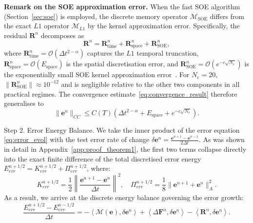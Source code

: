 \documentclass[a4paper,fleqn]{cas-sc}
\begin{document}
\begin{appendix}
\textbf{Remark on the SOE approximation error.} When the fast SOE algorithm (Section~\ref{sec:soe}) is employed, the discrete memory operator $\mathcal{M}_{\mathrm{SOE}}$ differs from the exact $L1$ operator $\mathcal{M}_{L1}$ by the kernel approximation error. Specifically, the residual $\boldsymbol{R}^n$ decomposes as
\begin{equation}
\boldsymbol{R}^n = \boldsymbol{R}_{\mathrm{time}}^n + \boldsymbol{R}_{\mathrm{space}}^n + \boldsymbol{R}_{\mathrm{SOE}}^n,
\end{equation}
where $\boldsymbol{R}_{\mathrm{time}}^n = \mathcal{O}(\Delta t^{2-\alpha})$ captures the $L1$ temporal truncation, $\boldsymbol{R}_{\mathrm{space}}^n = \mathcal{O}(E_{\mathrm{space}})$ is the spatial discretisation error, and $\boldsymbol{R}_{\mathrm{SOE}}^n = \mathcal{O}(e^{-c\sqrt{N_e}})$ is the exponentially small SOE kernel approximation error~\cite{ref6}. For $N_e = 20$, $\|\boldsymbol{R}_{\mathrm{SOE}}^n\| \approx 10^{-12}$ and is negligible relative to the other two components in all practical regimes. The convergence estimate~\eqref{eq:convergence_result} therefore generalises to
\begin{equation}
\|\mathbf{e}^n\|_{CC} \le C(T)\left( \Delta t^{2-\alpha} + E_{\mathrm{space}} + e^{-c\sqrt{N_e}} \right).
\end{equation}

Step 2. Error Energy Balance. 
We take the inner product of the error equation \eqref{eq:error_evol} with the test error rate of change $\delta \mathbf{e}^n = \frac{\mathbf{e}^{n+1} - \mathbf{e}^{n-1}}{2\Delta t}$. As was shown in detail in Appendix~\ref{app:proof_theorem1}, the first two terms collapse directly into the exact finite difference of the total discretised error energy $E_{err}^{n+1/2} = K_{err}^{n+1/2} + \Pi_{err}^{n+1/2}$, where:
\begin{equation}
K_{err}^{n+1/2} = \frac{1}{2} \left\| \frac{\mathbf{e}^{n+1}-\mathbf{e}^n}{\Delta t} \right\|^2, \quad \Pi_{err}^{n+1/2} = \frac{1}{8}\|\mathbf{e}^{n+1}+\mathbf{e}^n\|_A^2.
\end{equation}
As a result, we arrive at the discrete energy balance governing the error growth:
\begin{equation}\label{eq:error_balance}
\frac{E_{err}^{n+1/2} - E_{err}^{n-1/2}}{\Delta t} = - \left\langle \mathcal{M}(\mathbf{e}), \delta \mathbf{e}^n \right\rangle + \left\langle \Delta\mathbf{F}^n, \delta \mathbf{e}^n \right\rangle - \left\langle \boldsymbol{R}^n, \delta \mathbf{e}^n \right\rangle.
\end{equation}


\end{appendix}
\end{document}
